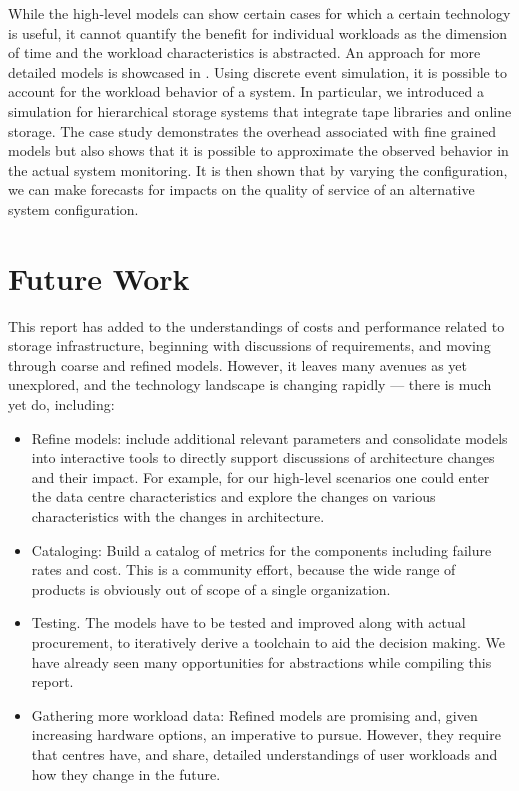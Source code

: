 \documentclass{../../template/esiwace-report}
\begin{document}
%
While the high-level models can show certain cases for which a certain technology is useful, it cannot quantify the benefit for individual workloads as the dimension of time and the workload characteristics is abstracted.
An approach for more detailed models is showcased in .
Using discrete event simulation, it is possible to account for the workload behavior of a system.
In particular, we introduced a simulation for hierarchical storage systems that integrate tape libraries and online storage.
The case study demonstrates the overhead associated with fine grained models but also shows that it is possible to approximate the observed behavior in the actual system monitoring.
It is then shown that by varying the configuration, we can make forecasts for impacts on the quality of service of an alternative system configuration.

\section{Future Work}
\label{further-work}

This report has added to the understandings of costs and performance related to storage infrastructure, beginning with discussions of requirements, and moving through coarse and refined models. However, it leaves many avenues as yet unexplored, and the technology landscape is changing rapidly --- there is much yet do, including:
\begin{itemize}
	\item Refine models: include additional relevant parameters and consolidate models into interactive tools to directly support discussions of architecture changes and their impact.
	For example, for our high-level scenarios one could enter the data centre characteristics and explore the changes on various characteristics with the changes in architecture.
	\item Cataloging: Build a catalog of metrics for the components including failure rates and cost.
	This is a community effort, because the wide range of products is obviously out of scope of a single organization.
	\item Testing. The models have to be tested and improved along with actual procurement, to iteratively derive a toolchain to aid the decision making.
	We have already seen many opportunities for abstractions while compiling this report.
	\item Gathering more workload data: Refined models are promising and, given increasing hardware options, an imperative to pursue.
	However, they require that centres have, and share, detailed understandings of user workloads and how they change in the future.
\end{itemize}
\end{document}

